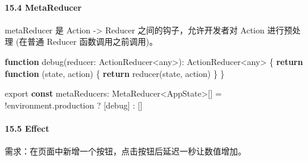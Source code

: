 \documentclass[
]{article}
\newenvironment{Shaded}{}{}
\newcommand{\AttributeTok}[1]{\textcolor[rgb]{0.49,0.56,0.16}{#1}}
\newcommand{\ControlFlowTok}[1]{\textcolor[rgb]{0.00,0.44,0.13}{\textbf{#1}}}
\newcommand{\FunctionTok}[1]{\textcolor[rgb]{0.02,0.16,0.49}{#1}}
\newcommand{\ImportTok}[1]{#1}
\newcommand{\KeywordTok}[1]{\textcolor[rgb]{0.00,0.44,0.13}{\textbf{#1}}}
\newcommand{\NormalTok}[1]{#1}
\newcommand{\OperatorTok}[1]{\textcolor[rgb]{0.40,0.40,0.40}{#1}}
\begin{document}
\hypertarget{154-metareducer}{%
\paragraph{15.4 MetaReducer}\label{154-metareducer}}

metaReducer 是 Action -\textgreater{} Reducer 之间的钩子，允许开发者对
Action 进行预处理 (在普通 Reducer 函数调用之前调用)。

\begin{Shaded}
\begin{Highlighting}[]
\KeywordTok{function} \FunctionTok{debug}\NormalTok{(reducer}\OperatorTok{:}\NormalTok{ ActionReducer}\OperatorTok{\textless{}}\NormalTok{any}\OperatorTok{\textgreater{}}\NormalTok{)}\OperatorTok{:}\NormalTok{ ActionReducer}\OperatorTok{\textless{}}\NormalTok{any}\OperatorTok{\textgreater{}}\NormalTok{ \{}
  \ControlFlowTok{return} \KeywordTok{function}\NormalTok{ (state}\OperatorTok{,}\NormalTok{ action) \{}
    \ControlFlowTok{return} \FunctionTok{reducer}\NormalTok{(state}\OperatorTok{,}\NormalTok{ action)}
\NormalTok{  \}}
\NormalTok{\}}

\ImportTok{export} \KeywordTok{const}\NormalTok{ metaReducers}\OperatorTok{:}\NormalTok{ MetaReducer}\OperatorTok{\textless{}}\NormalTok{AppState}\OperatorTok{\textgreater{}}\NormalTok{[] }\OperatorTok{=} \OperatorTok{!}\NormalTok{environment}\OperatorTok{.}\AttributeTok{production}
  \OperatorTok{?}\NormalTok{ [debug]}
  \OperatorTok{:}\NormalTok{ []}
\end{Highlighting}
\end{Shaded}

\hypertarget{155-effect}{%
\paragraph{15.5 Effect}\label{155-effect}}

需求：在页面中新增一个按钮，点击按钮后延迟一秒让数值增加。
\end{document}
